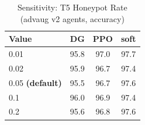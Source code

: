 \begin{table}[h]
\centering
\caption{Sensitivity: T5 Honeypot Rate (advaug v2 agents, accuracy)}
\label{tab:sensitivity_tier5_honeypot_rate}
\begin{tabular}{lccc}
\toprule
Value & DG & PPO & soft \\
\midrule
  0.01 & 95.8 & 97.0 & 97.7 \\
  0.02 & 95.9 & 96.7 & 97.4 \\
  0.05 \textbf{(default)} & 95.5 & 96.7 & 97.6 \\
  0.1 & 96.0 & 96.9 & 97.4 \\
  0.2 & 95.6 & 96.8 & 97.6 \\
\bottomrule
\end{tabular}
\end{table}